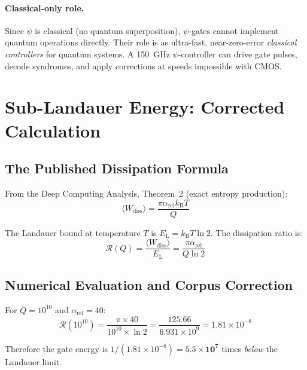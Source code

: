 \documentclass[11pt]{article}
\theoremstyle{definition}
\theoremstyle{remark}
\newcommand{\kB}{k_{\mathrm{B}}}
\newcommand{\EL}{E_{\mathrm{L}}}
\begin{document}
\paragraph{Classical-only role.}
Since $\psi$ is classical (no quantum superposition), $\psi$-gates cannot
implement quantum operations directly. Their role is as ultra-fast, near-zero-error
\emph{classical controllers} for quantum systems. A 150~GHz $\psi$-controller
can drive gate pulses, decode syndromes, and apply corrections at speeds
impossible with CMOS.

\section{Sub-Landauer Energy: Corrected Calculation}
\label{sec:sub_landauer_corrected}

\subsection{The Published Dissipation Formula}

From the Deep Computing Analysis, Theorem~2 (exact entropy production):
\begin{equation}
\langle W_{\mathrm{diss}}\rangle = \frac{\pi\alpha_{\mathrm{rel}}\kB T}{Q}
\label{eq:wdiss}
\end{equation}

The Landauer bound at temperature $T$ is $\EL = \kB T \ln 2$.
The dissipation ratio is:
\begin{equation}
\mathcal{R}(Q) = \frac{\langle W_{\mathrm{diss}}\rangle}{\EL}
= \frac{\pi\alpha_{\mathrm{rel}}}{Q \ln 2}
\label{eq:ratio}
\end{equation}

\subsection{Numerical Evaluation and Corpus Correction}

For $Q = 10^{10}$ and $\alpha_{\mathrm{rel}} = 40$:
\begin{equation}
\mathcal{R}(10^{10}) = \frac{\pi \times 40}{10^{10} \times \ln 2}
= \frac{125.66}{6.931 \times 10^9}
= 1.81 \times 10^{-8}
\label{eq:ratio_numerical}
\end{equation}

Therefore the gate energy is $1/(1.81 \times 10^{-8}) = \mathbf{5.5 \times 10^7}$
times \emph{below} the Landauer limit.
\end{document}
